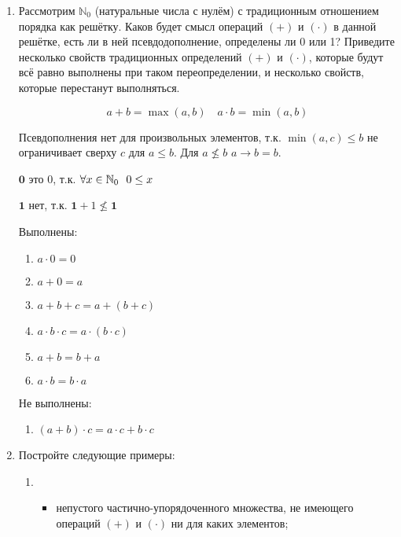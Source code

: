 \begin{enumerate}
\begin{enumerate}
\begin{proof}
                              Прочие случаи аналогичны.
                        \end{proof}
            \end{enumerate}

      \item Рассмотрим $\mathbb{N}_0$ (натуральные числа с нулём) с традиционным отношением порядка как решётку.
            Каков будет смысл операций $(+)$ и $(\cdot)$ в данной решётке, есть ли в ней псевдодополнение,
            определены ли 0 или 1? Приведите несколько свойств традиционных определений $(+)$ и $(\cdot)$,
            которые будут всё равно выполнены при таком переопределении, и несколько свойств, которые перестанут выполняться.

            \[a + b = \max(a, b) \quad a \cdot b = \min(a, b)\]

            Псевдополнения нет для произвольных элементов, т.к. \(\min(a, c) \leq b\) не ограничивает сверху \(c\) для \(a \leq b\). Для \(a \not \leq b\) \(a \to b = b\).

            \(\mathbf 0\) это \(0\), т.к. \(\forall x\in\mathbb{N}_0 \ \ 0 \leq x\)

            \(\mathbf 1\) нет, т.к. \(\mathbf 1 + 1 \not \leq \mathbf 1\)

            Выполнены:
            \begin{enumerate}
                  \item \(a \cdot 0 = 0\)
                  \item \(a + 0 = a\)
                  \item \(a + b + c = a + (b + c)\)
                  \item \(a \cdot b \cdot c = a \cdot (b \cdot c)\)
                  \item \(a + b = b + a\)
                  \item \(a\cdot b = b\cdot a\)
            \end{enumerate}

            Не выполнены:
            \begin{enumerate}
                  \item \((a + b) \cdot c = a\cdot c + b\cdot c\)
            \end{enumerate}

      \item Постройте следующие примеры:
            \begin{enumerate}
                  \item \begin{itemize}
                              \item непустого частично-упорядоченного множества, не имеющего операций $(+)$ и $(\cdot)$ ни для каких элементов;


\end{itemize}
\end{enumerate}
\end{enumerate}
